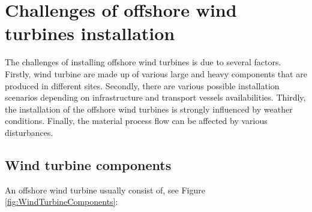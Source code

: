 \section{Challenges of offshore wind turbines installation}
The challenges of installing offshore wind turbines is due to several factors. Firstly, wind turbine are made up of various large and heavy components that are produced in different sites. Secondly, there are various possible installation scenarios depending on infrastructure and transport vessels availabilities. Thirdly, the installation of the offshore wind turbines is strongly influenced by weather conditions.  
Finally, the material process flow can be affected by various disturbances.

\subsection{Wind turbine components}
An offshore wind turbine usually consist of, see Figure \ref{fig:WindTurbineComponents}:

